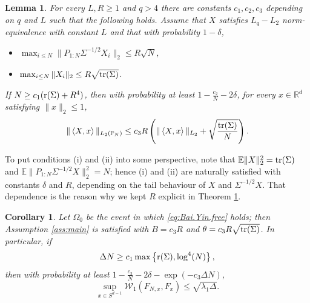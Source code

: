\documentclass[11pt]{amsart}
\newcommand{\R}{\mathbb{R}}
\newcommand{\inr}[1]{\left\langle #1 \right\rangle}
\newcommand{\W}{\mathcal{W}}
\newtheorem{lemma}[theorem]{Lemma}
\newtheorem{corollary}[theorem]{Corollary}
\theoremstyle{definition}
\newcommand{\E}{\mathbb{E}}
\renewcommand{\P}{\mathbb{P}}
\numberwithin{equation}{section}
\begin{document}
\begin{lemma}
\label{lem:Bai.Yin.non.isotropic}
	For every  $L,R\geq 1$ and $q>4$ there are constants $c_1,c_2,c_3$ depending on $q$ and $L$ such that the following holds.
	Assume that $X$ satisfies $L_q-L_2$ norm-equivalence with constant $L$ and that %
	with probability $1-\delta$,
	\begin{itemize}
	\item[(i)]  $\max_{i\leq N} \| P_{1:N} \Sigma^{-1/2}X_i \|_2 \leq  R \sqrt N$,
	\item[(ii)] $\max_{i\leq N}\|X_i\|_2\leq R \sqrt{{\rm tr}(\Sigma)}$.
	\end{itemize}
	If $N\geq c_1 ( {\rm r}(\Sigma) + R^4)$,
	then with  probability at least $1-\frac{c_2}{N}-2\delta$, for every $x\in \R^d$ satisfying $\|x\|_2\leq 1$,
	\begin{align}
	\label{eq:Bai.Yin.free}
	\|\inr{X,x}\|_{L_2(\P_N)}
	\leq c_3R \left( \|\inr{X,x}\|_{L_2} + \sqrt \frac{{\rm tr}(\Sigma)}{N} \right) .
	\end{align}
\end{lemma}


To put  conditions (i) and (ii) into some perspective, note that
$\E\|X\|_{2}^{2} = {\rm tr}(\Sigma)$ and 
$\E \| P_{1:N} \Sigma^{-1/2}X \|_2^{2} =  N$; hence (i) and (ii) are  naturally satisfied with constants $\delta$ and $R$, depending on the tail behaviour of  $X$ and $\Sigma^{-1/2} X$.
That  dependence is the reason why we kept $R$ explicit in Theorem \ref{lem:Bai.Yin.non.isotropic}.



\begin{corollary}
\label{cor:Bai.Yin.free}
	Let $\Omega_{0}$ be the event in which \eqref{eq:Bai.Yin.free} holds; then Assumption \ref{ass:main} is satisfied with $B=c_3 R $ and $\theta=c_3 R \sqrt{{\rm tr}(\Sigma)}$.
	In particular, if 
	\[ \Delta N \geq c_1 \max\left\{ {\rm r}(\Sigma) , \log^4(N)\right\}, \]
	then with probability at least $1-\frac{c_2}{N}-2\delta - \exp(-c_3\Delta N)$,
	\[  \sup_{x\in S^{d-1}} \W_1(F_{N,x},F_x)
	\leq \sqrt{\lambda_1 \Delta}.\]
\end{corollary}
\end{document}
